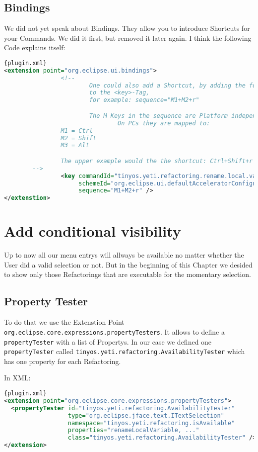 \documentclass[a4paper,10pt]{report}
\begin{document}
\subsection{Bindings}
We did not yet speak about Bindings. They allow you to introduce Shortcuts for your Commands. We did it first, but removed it later again.
I think the following Code explains itself:
\begin{lstlisting}[language=XML,caption=Introduce Shortcuts ({\it plugin.xml})]{plugin.xml}
<extension point="org.eclipse.ui.bindings">
                <!--
                        One could also add a Shortcut, by adding the following Attribute
                        to the <key>-Tag,
                        for example: sequence="M1+M2+r"

                        The M Keys in the sequence are Platform independent keys.
                                On PCs they are mapped to:
                M1 = Ctrl
                M2 = Shift
                M3 = Alt

                The upper example would the the shortcut: Ctrl+Shift+r
		-->
                <key commandId="tinyos.yeti.refactoring.rename.local.variable"
                     schemeId="org.eclipse.ui.defaultAcceleratorConfiguration"
                     sequence="M1+M2+r" />
</extenstion>
\end{lstlisting}

\section{Add conditional visibility}
Up to now all our menu entrys will allways be available no matter whether the User did a valid selection or not. But in the beginning of this Chapter we desided to show only 
those Refactorings that are executable for the momentary selection.
\subsection{Property Tester}
To do that we use the Extenstion Point \verb!org.eclipse.core.expressions.propertyTesters!. It allows to define a \verb!propertyTester! with a list of Propertys. In our
case we defined one \verb!propertyTester! called \verb!tinyos.yeti.refactoring.AvailabilityTester! which has one property for each Refactoring.

In XML:
\begin{lstlisting}[language=XML,caption=Property Tester ({\it plugin.xml})]{plugin.xml}
<extension point="org.eclipse.core.expressions.propertyTesters">
  <propertyTester id="tinyos.yeti.refactoring.AvailabilityTester"
                  type="org.eclipse.jface.text.ITextSelection"
                  namespace="tinyos.yeti.refactoring.isAvailable"
                  properties="renameLocalVariable, ..."
                  class="tinyos.yeti.refactoring.AvailabilityTester" />
</extension>
\end{lstlisting}
\end{document}
